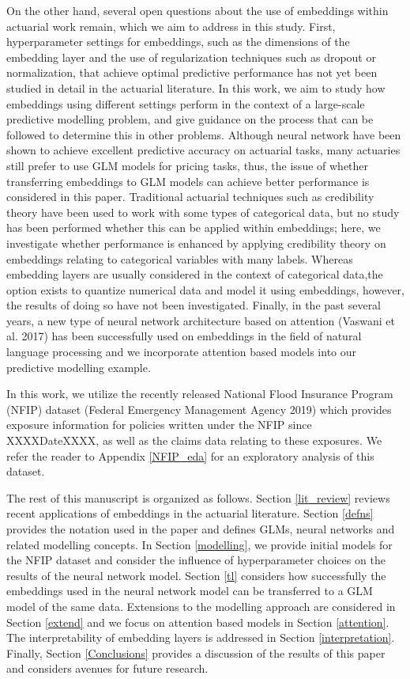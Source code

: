 \documentclass{article}
\begin{document}
On the other hand, several open questions about the use of embeddings
within actuarial work remain, which we aim to address in this study.
First, hyperparameter settings for embeddings, such as the dimensions of
the embedding layer and the use of regularization techniques such as
dropout or normalization, that achieve optimal predictive performance
has not yet been studied in detail in the actuarial literature. In this
work, we aim to study how embeddings using different settings perform in
the context of a large-scale predictive modelling problem, and give
guidance on the process that can be followed to determine this in other
problems. Although neural network have been shown to achieve excellent
predictive accuracy on actuarial tasks, many actuaries still prefer to
use GLM models for pricing tasks, thus, the issue of whether
transferring embeddings to GLM models can achieve better performance is
considered in this paper. Traditional actuarial techniques such as
credibility theory have been used to work with some types of categorical
data, but no study has been performed whether this can be applied within
embeddings; here, we investigate whether performance is enhanced by
applying credibility theory on embeddings relating to categorical
variables with many labels. Whereas embedding layers are usually
considered in the context of categorical data,the option exists to
quantize numerical data and model it using embeddings, however, the
results of doing so have not been investigated. Finally, in the past
several years, a new type of neural network architecture based on
attention (Vaswani et al. 2017) has been successfully used on embeddings
in the field of natural language processing and we incorporate attention
based models into our predictive modelling example.

In this work, we utilize the recently released National Flood Insurance
Program (NFIP) dataset (Federal Emergency Management Agency 2019) which
provides exposure information for policies written under the NFIP since
XXXXDateXXXX, as well as the claims data relating to these exposures. We
refer the reader to Appendix \ref{NFIP_eda} for an exploratory analysis
of this dataset.

The rest of this manuscript is organized as follows. Section
\ref{lit_review} reviews recent applications of embeddings in the
actuarial literature. Section \ref{defns} provides the notation used in
the paper and defines GLMs, neural networks and related modelling
concepts. In Section \ref{modelling}, we provide initial models for the
NFIP dataset and consider the influence of hyperparameter choices on the
results of the neural network model. Section \ref{tl} considers how
successfully the embeddings used in the neural network model can be
transferred to a GLM model of the same data. Extensions to the modelling
approach are considered in Section \ref{extend} and we focus on
attention based models in Section \ref{attention}. The interpretability
of embedding layers is addressed in Section \ref{interpretation}.
Finally, Section \ref{Conclusions} provides a discussion of the results
of this paper and considers avenues for future research.
\end{document}
